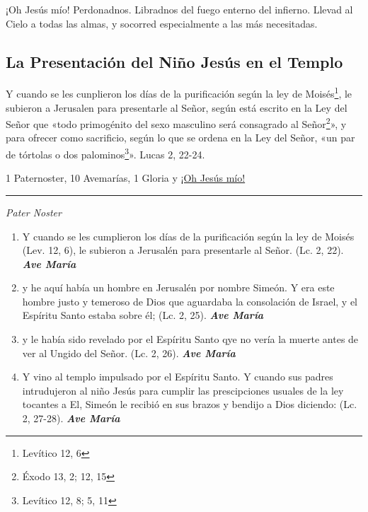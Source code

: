 \documentclass[a4paper,11pt, oneside]{report}
\begin{document}
{{    \hypertarget{finalNatividad}{¡Oh Jesús mío! Perdonadnos. Libradnos del fuego enterno del infierno. Llevad al Cielo a todas las almas, y socorred especialmente a las más 
    necesitadas.}
  }
    
  \subsection*{La Presentación del Niño Jesús en el Templo}
  {
    
    Y cuando se les cunplieron los días de la purificación según la ley de Moisés\footnote{Levítico 12, 6}, le subieron a Jerusalen para presentarle al Señor, según está escrito
    en la Ley del Señor que «todo primogénito del sexo masculino será consagrado al Señor\footnote{Éxodo 13, 2; 12, 15}», y para ofrecer como sacrificio, según lo que 
    se ordena en la Ley del Señor, «un par de tórtolas o dos palominos\footnote{Levítico 12, 8; 5, 11}». Lucas 2, 22-24.

    \medskip

    1 Paternoster, 10 Avemarías, 1 Gloria y \hyperlink{finalPresentacion}{¡Oh Jesús mío!}
    

    \medskip

    \begin{center}\rule{1\linewidth}{\linethickness}\end{center}

    \medskip
    \textit{Pater Noster}

    \begin{enumerate}
      
      \item Y cuando se les cumplieron los días de la purificación según la ley de Moisés (Lev. 12, 6), 
      le subieron a Jerusalén para presentarle al Señor. (Lc. 2, 22). \textbf{\textit{Ave María}}

      \item y he aquí había un hombre en Jerusalén por nombre Simeón. Y era este hombre justo y temeroso de Dios que aguardaba la consolación de Israel, 
      y el Espíritu Santo estaba sobre él; (Lc. 2, 25). \textbf{\textit{Ave María}}

      \item y le había sido revelado por el Espíritu Santo qye no vería la muerte antes de ver al Ungido del Señor. (Lc. 2, 26). \textbf{\textit{Ave María}}

      \item Y vino al templo impulsado por el Espíritu Santo. Y cuando sus padres intrudujeron al niño Jesús para cumplir las prescipciones usuales
      de la ley tocantes a El, Simeón le recibió en sus brazos y bendijo a Dios diciendo: (Lc. 2, 27-28). \textbf{\textit{Ave María}}


\end{enumerate}}}
\end{document}
